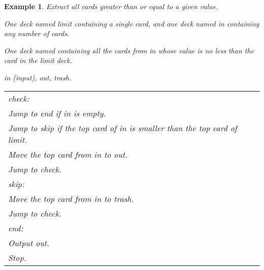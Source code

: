 \documentclass[a4paper,twoside]{tufte-handout}
\newtheorem{example}{Example}
\newcommand\lbl[1]{\hspace{-1em}\emph{#1:}}
\begin{document}
\begin{example}
  Extract all cards greater than or equal to a given value.
  \begin{description}
  \item[Input:] One deck named \emph{limit} containing a single card,
    and one deck named \emph{in} containing any number of cards.
  \item[Output:] One deck named containing all the cards
    from \emph{in} whose value is no less than the card in the
    \emph{limit} deck.
  \item[Decks:] \emph{in} (input), \emph{out}, \emph{trash}.


\clearpage

 \item[Algorithm:]
  \item\normalfont
    \begin{tabular}{l}
      \lbl{check}\\
      Jump to \emph{end} if \emph{in} is empty.\\
      Jump to \emph{skip} if the top card of \emph{in} is smaller than
      the top card of \emph{limit}.\\
      Move the top card from \emph{in} to \emph{out}.\\
      Jump to \emph{check}.\\
      \lbl{skip}\\
      Move the top card from \emph{in} to \emph{trash}.\\
      Jump to \emph{check}.\\
      \lbl{end}\\
      Output \emph{out}.\\
      Stop.
    \end{tabular}
  \end{description}
\end{example}
\end{document}
